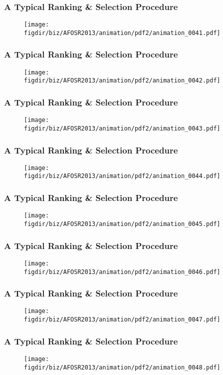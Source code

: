 \documentclass[13pt]{beamer}
\newcommand{\figdir}{../../fig}
\begin{document}
\begin{frame}\frametitle{A Typical Ranking \& Selection Procedure}\begin{figure}\texttt{[image: \\figdir/biz/AFOSR2013/animation/pdf2/animation\_0041.pdf]}\end{figure}\end{frame}
\begin{frame}\frametitle{A Typical Ranking \& Selection Procedure}\begin{figure}\texttt{[image: \\figdir/biz/AFOSR2013/animation/pdf2/animation\_0042.pdf]}\end{figure}\end{frame}
\begin{frame}\frametitle{A Typical Ranking \& Selection Procedure}\begin{figure}\texttt{[image: \\figdir/biz/AFOSR2013/animation/pdf2/animation\_0043.pdf]}\end{figure}\end{frame}
\begin{frame}\frametitle{A Typical Ranking \& Selection Procedure}\begin{figure}\texttt{[image: \\figdir/biz/AFOSR2013/animation/pdf2/animation\_0044.pdf]}\end{figure}\end{frame}
\begin{frame}\frametitle{A Typical Ranking \& Selection Procedure}\begin{figure}\texttt{[image: \\figdir/biz/AFOSR2013/animation/pdf2/animation\_0045.pdf]}\end{figure}\end{frame}
\begin{frame}\frametitle{A Typical Ranking \& Selection Procedure}\begin{figure}\texttt{[image: \\figdir/biz/AFOSR2013/animation/pdf2/animation\_0046.pdf]}\end{figure}\end{frame}
\begin{frame}\frametitle{A Typical Ranking \& Selection Procedure}\begin{figure}\texttt{[image: \\figdir/biz/AFOSR2013/animation/pdf2/animation\_0047.pdf]}\end{figure}\end{frame}
\begin{frame}\frametitle{A Typical Ranking \& Selection Procedure}\begin{figure}\texttt{[image: \\figdir/biz/AFOSR2013/animation/pdf2/animation\_0048.pdf]}\end{figure}\end{frame}
\end{document}
